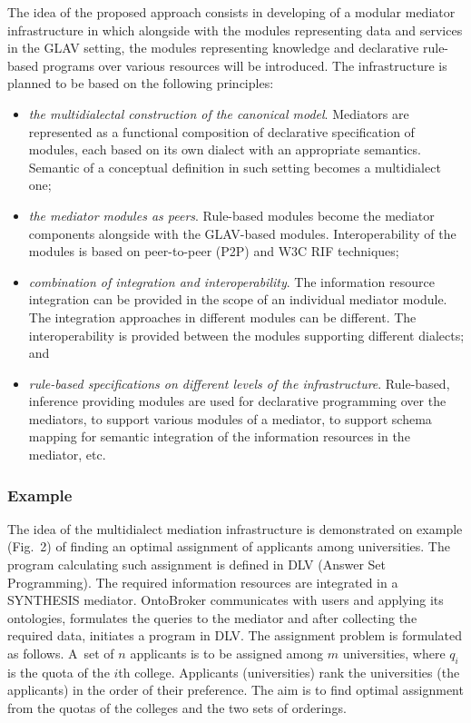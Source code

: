 \begin{multicols}{2}
The idea of the proposed approach consists in developing of a modular mediator infrastructure in 
which alongside with the modules representing data and services in the GLAV setting, the modules 
representing knowledge and declarative rule-based programs over various resources will be 
introduced. The infrastructure is planned to be based on the following principles:
\begin{itemize}
\item \textit{the multidialectal construction of the canonical model}. Mediators are represented 
as a functional composition of declarative specification of modules, each based on its own 
dialect with an appropriate semantics. Semantic of a conceptual definition in such setting 
becomes a multidialect one;
\item \textit{the mediator modules as peers}. Rule-based modules become the mediator 
components alongside with the GLAV-based modules. Interoperability of the modules is based 
on peer-to-peer (P2P) and W3C RIF techniques;
\item \textit{combination of integration and interoperability}. The information resource 
integration can be provided in the scope of an individual mediator module. The integration 
approaches in different modules can be different. The interoperability is provided between the 
modules supporting different dialects; and
\item \textit{rule-based specifications on different levels of the infrastructure}. Rule-based, 
inference providing modules are used for declarative programming over the mediators, to 
support various modules of a mediator, to support schema mapping for semantic integration of 
the information resources in the mediator, etc.
\end{itemize}

\subsubsection{Example}

\noindent
The idea of the multidialect mediation infrastructure is demonstrated on example (Fig.~2) of 
finding an optimal assignment of applicants among universities. The program calculating such 
assignment is defined in DLV (Answer Set Programming). The required information resources are 
integrated in a SYNTHESIS mediator. OntoBroker communicates with users and applying its 
ontologies, formulates the queries to the mediator and after collecting the required data, initiates a 
program in DLV. The assignment problem is formulated as follows. A~set of $n$ applicants is to be 
assigned among $m$ universities, where $q_i$ is the quota of the $i$th college. Applicants 
(universities) rank the universities (the applicants) in the order of their preference. The aim is to 
find optimal assignment from the quotas of the colleges and the two sets of orderings. 


\end{multicols}
